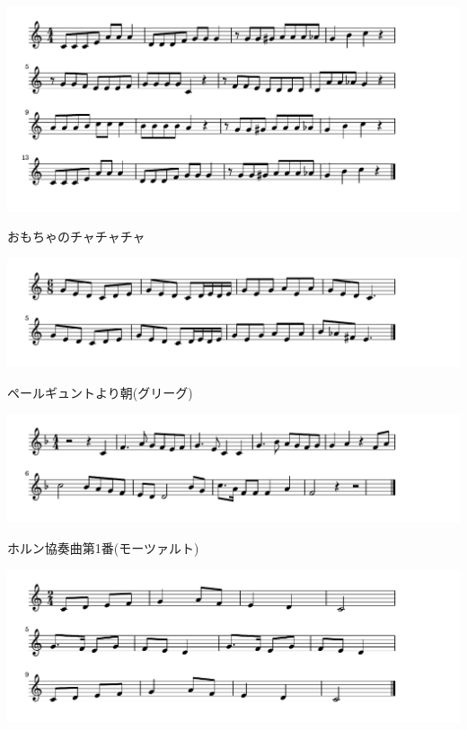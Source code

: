 \documentclass[a4paper]{ltjsarticle}
\begin{document}
\includegraphics[clip]{omochanochachacha_crop.pdf}

\vspace{-10mm} \hspace{10mm}
おもちゃのチャチャチャ

\includegraphics[clip]{peergyntasagrieg_crop.pdf}

\vspace{-10mm} \hspace{10mm}
ペールギュントより朝(グリーグ)

\includegraphics[clip]{hornmozart_crop.pdf}

\vspace{-10mm} \hspace{10mm}
ホルン協奏曲第1番(モーツァルト)

\includegraphics[clip]{ikenoame_crop.pdf}
\end{document}
